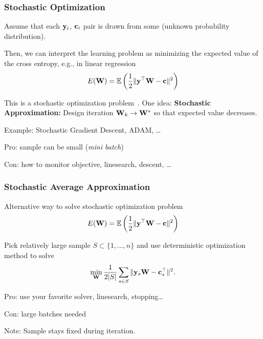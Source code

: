 \documentclass[12pt,fleqn]{beamer}
\begin{document}
\begin{frame}[fragile]\frametitle{Stochastic Optimization}
	Assume that each ${\bf y}_i$, ${\bf c}_i$ pair is drawn from some (unknown probability distribution). 
	
	Then, we can interpret the learning problem as minimizing the expected value of the cross entropy, e.g., in linear regression
	$$
		E({\bf W}) = {\mathbb{E}} \left({\frac 12} \|{\bf y}^\top {\bf W} - {\bf c}\|^2\right)
	$$
	
	This is a stochastic optimization problem~\cite{bottou2016optimization}. \pause One idea: \textbf{Stochastic Approximation: } Design iteration ${\bf W}_k \to {\bf W}^*$ so that expected value decreases.
		
		Example: Stochastic Gradient Descent, ADAM, \ldots
		
		Pro: sample can be small (\emph{mini batch})
		
		Con: how to monitor objective, linesearch, descent, \ldots
\end{frame}
\begin{frame}
	\frametitle{Stochastic Average Approximation}
	
	Alternative way to solve stochastic optimization problem
	$$
	E({\bf W}) = {\mathbb{E}} \left({\frac 12} \|{\bf y}^\top {\bf W} - {\bf c}\|^2\right)
	$$
	
	 Pick relatively large sample $S \subset \{ 1,\ldots,n\}$ and use deterministic optimization method to solve
			$$
				\min_{\bf W}  \frac{1}{2|S|} \sum_{s\in S} \| {\bf y}_s {\bf W} - {\bf c}_s^\top \|^2.
			$$
		
			Pro: use your favorite solver, linesearch, stopping\ldots
			
			Con: large batches needed
			
			\begin{center}
				Note: Sample stays fixed during iteration.
			\end{center}
\end{frame}
\end{document}
